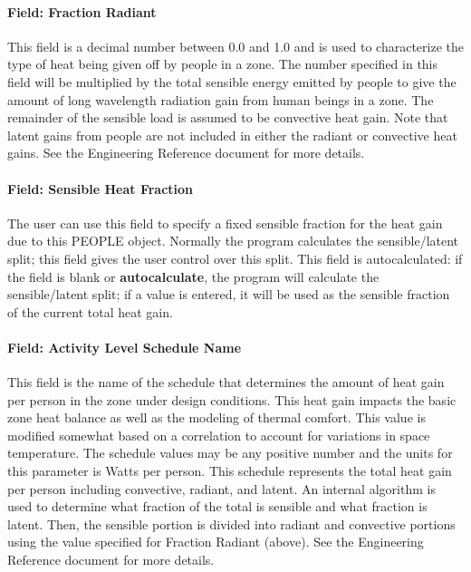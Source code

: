 \paragraph{Field: Fraction Radiant}\label{field-fraction-radiant}

This field is a decimal number between 0.0 and 1.0 and is used to characterize the type of heat being given off by people in a zone. The number specified in this field will be multiplied by the total sensible energy emitted by people to give the amount of long wavelength radiation gain from human beings in a zone. The remainder of the sensible load is assumed to be convective heat gain. Note that latent gains from people are not included in either the radiant or convective heat gains. See the Engineering Reference document for more details.

\paragraph{Field: Sensible Heat Fraction}\label{field-sensible-heat-fraction}

The user can use this field to specify a fixed sensible fraction for the heat gain due to this PEOPLE object. Normally the program calculates the sensible/latent split; this field gives the user control over this split. This field is autocalculated: if the field is blank or \textbf{autocalculate}, the program will calculate the sensible/latent split; if a value is entered, it will be used as the sensible fraction of the current total heat gain.

\paragraph{Field: Activity Level Schedule Name}\label{field-activity-level-schedule-name}

This field is the name of the schedule that determines the amount of heat gain per person in the zone under design conditions. This heat gain impacts the basic zone heat balance as well as the modeling of thermal comfort. This value is modified somewhat based on a correlation to account for variations in space temperature. The schedule values may be any positive number and the units for this parameter is Watts per person. This schedule represents the total heat gain per person including convective, radiant, and latent. An internal algorithm is used to determine what fraction of the total is sensible and what fraction is latent. Then, the sensible portion is divided into radiant and convective portions using the value specified for Fraction Radiant (above). See the Engineering Reference document for more details.

